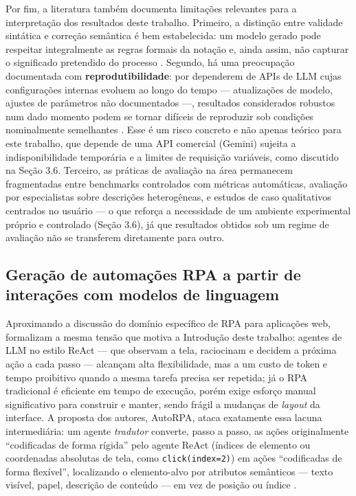 \documentclass[
	article,
	12pt,
	oneside,
	a4paper,
	section=TITLE,
	english,
	brazil,
	sumario=tradicional
	]{abntex2}
\begin{document}
Por fim, a literatura também documenta limitações relevantes para a
interpretação dos resultados deste trabalho. Primeiro, a distinção entre
validade sintática e correção semântica é bem estabelecida: um modelo
gerado pode respeitar integralmente as regras formais da notação e, ainda
assim, não capturar o significado pretendido do processo
\cite{bettencourt2026}. Segundo, há uma preocupação documentada com
\textbf{reprodutibilidade}: por dependerem de APIs de LLM cujas
configurações internas evoluem ao longo do tempo --- atualizações de
modelo, ajustes de parâmetros não documentados ---, resultados
considerados robustos num dado momento podem se tornar difíceis de
reproduzir sob condições nominalmente semelhantes
\cite{bettencourt2026}. Esse é um risco concreto e não apenas teórico
para este trabalho, que depende de uma API comercial (Gemini) sujeita a
indisponibilidade temporária e a limites de requisição variáveis, como
discutido na Seção 3.6. Terceiro, as práticas de avaliação na área
permanecem fragmentadas entre benchmarks controlados com métricas
automáticas, avaliação por especialistas sobre descrições heterogêneas, e
estudos de caso qualitativos centrados no usuário \cite{bettencourt2026}
--- o que reforça a necessidade de um ambiente experimental próprio e
controlado (Seção 3.6), já que resultados obtidos sob um regime de
avaliação não se transferem diretamente para outro.

\subsection{Geração de automações RPA a partir de interações com modelos de linguagem}

Aproximando a discussão do domínio específico de RPA para aplicações
web,  formalizam a mesma tensão que motiva a
Introdução deste trabalho: agentes de LLM no estilo ReAct --- que
observam a tela, raciocinam e decidem a próxima ação a cada passo ---
alcançam alta flexibilidade, mas a um custo de token e tempo proibitivo
quando a mesma tarefa precisa ser repetida; já o RPA tradicional é
eficiente em tempo de execução, porém exige esforço manual significativo
para construir e manter, sendo frágil a mudanças de \textit{layout} da
interface. A proposta dos autores, AutoRPA, ataca exatamente essa lacuna
intermediária: um agente \textit{tradutor} converte, passo a passo, as
ações originalmente ``codificadas de forma rígida'' pelo agente ReAct
(índices de elemento ou coordenadas absolutas de tela, como
\texttt{click(index=2)}) em ações ``codificadas de forma flexível'',
localizando o elemento-alvo por atributos semânticos --- texto visível,
papel, descrição de conteúdo --- em vez de posição ou índice
\cite{chen2026}.
\end{document}
